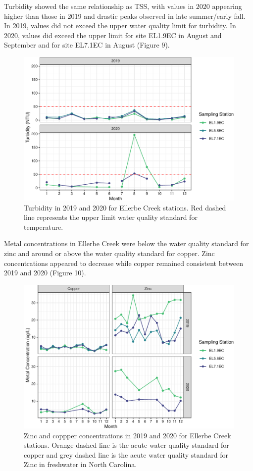 \documentclass[
  12pt,
]{article}
\begin{document}
Turbidity showed the same relationship as TSS, with values in 2020
appearing higher than those in 2019 and drastic peaks observed in late
summer/early fall. In 2019, values did not exceed the upper water
quality limit for turbidity. In 2020, values did exceed the upper limit
for site EL1.9EC in August and September and for site EL7.1EC in August
(Figure 9).

\begin{figure}
\centering
\includegraphics{August_Lindborg_ENV872_Project_files/figure-latex/unnamed-chunk-21-1.pdf}
\caption{Turbidity in 2019 and 2020 for Ellerbe Creek stations. Red
dashed line represents the upper limit water quality standard for
temperature.}
\end{figure}

Metal concentrations in Ellerbe Creek were below the water quality
standard for zinc and around or above the water quality standard for
copper. Zinc concentrations appeared to decrease while copper remained
consistent between 2019 and 2020 (Figure 10).

\begin{figure}
\centering
\includegraphics{August_Lindborg_ENV872_Project_files/figure-latex/unnamed-chunk-22-1.pdf}
\caption{Zinc and coppper concentrations in 2019 and 2020 for Ellerbe
Creek stations. Orange dashed line is the acute water quality standard
for copper and grey dashed line is the acute water quality standard for
Zinc in freshwater in North Carolina.}
\end{figure}
\end{document}
